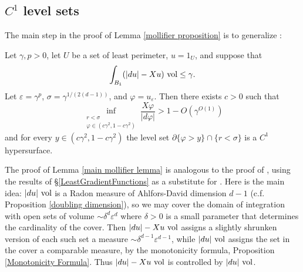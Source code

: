 
\subsection{\texorpdfstring{$C^1$}{C1} level sets}
The main step in the proof of Lemma \ref{mollifier proposition} is to generalize \cite[Theorem 7.3, Remark 7.4]{Giusti77}:

\begin{lemma}\label{main mollifier lemma}
Let $\gamma, p > 0$, let $U$ be a set of least perimeter, $u = 1_U$, and suppose that
\begin{equation}\label{hypothesis on main mollifier lemma}
\int_{B_1} (|du| - Xu) ~\mathrm{vol} \leq \gamma.
\end{equation}
Let $\varepsilon = \gamma^p$, $\sigma = \gamma^{1/(2(d - 1))}$, and $\varphi = u_\varepsilon$. Then there exists $c > 0$ such that
\begin{equation}\label{claim on main mollifier lemma}
\inf_{\substack{r < \sigma\\\varphi \in (c\gamma^2, 1 - c\gamma^2)}} \frac{X \varphi}{|d\varphi|} > 1 - O(\gamma^{O(1)})
\end{equation}
and for every $y \in (c\gamma^2, 1 - c\gamma^2)$ the level set $\partial \{\varphi > y\} \cap \{r < \sigma\}$ is a $C^1$ hypersurface.
\end{lemma}

The proof of Lemma \ref{main mollifier lemma} is analogous to the proof of \cite[Theorem 7.3]{Giusti77}, using the results of \S\ref{LeastGradientFunctions} as a substitute for \cite[Chapter 5]{Giusti77}.
Here is the main idea: $|du| ~\mathrm{vol}$ is a Radon measure of Ahlfors-David dimension $d - 1$ (c.f. Proposition \ref{doubling dimension}), so we may cover the domain of integration with open sets of volume $\sim \delta^d\varepsilon^d$ where $\delta > 0$ is a small parameter that determines the cardinality of the cover.
Then $|du| - Xu ~\mathrm{vol}$ assigns a slightly shrunken version of each such set a measure $\sim \delta^{d - 1} \varepsilon^{d - 1}$, while $|du|~\mathrm{vol}$ assigns the set in the cover a comparable measure, by the monotonicity formula, Proposition \ref{Monotonicity Formula}.
Thus $|du| - Xu ~\mathrm{vol}$ is controlled by $|du|~\mathrm{vol}$.

